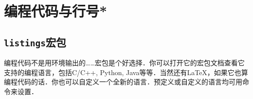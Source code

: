 \section{编程代码与行号*}
\label{sec:coding}
\subsection{\texttt{listings}宏包}
编程代码不是用环境输出的……宏包是个好选择．你可以打开它的宏包文档查看它支持的编程语言，包括C/C++, Python, Java等等．当然还有\LaTeX，如果它也算编程代码的话．你也可以自定义一个全新的语言．预定义或自定义的语言均可用命令来设置．
\begin{latex}
\end{latex}

